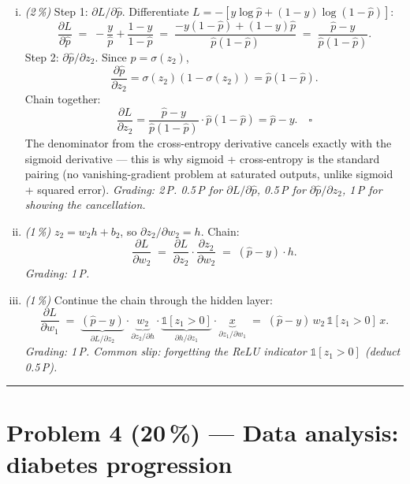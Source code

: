 \documentclass[11pt,a4paper]{article}
\newcommand{\points}[1]{\textbf{(#1\,\%)}}
\newcommand{\subpoints}[1]{\textit{(#1\,\%)}}
\begin{document}
\begin{enumerate}[(i)]
  \item \subpoints{2} Step 1: $\partial L / \partial \hat p$. Differentiate
        $L = -[y\log\hat p + (1-y)\log(1-\hat p)]$:
        $$\frac{\partial L}{\partial \hat p}
          \;=\; -\frac{y}{\hat p} + \frac{1-y}{1-\hat p}
          \;=\; \frac{-y(1-\hat p) + (1-y)\hat p}{\hat p(1-\hat p)}
          \;=\; \frac{\hat p - y}{\hat p(1 - \hat p)}.$$
        Step 2: $\partial \hat p / \partial z_2$. Since $\hat p = \sigma(z_2)$,
        $$\frac{\partial \hat p}{\partial z_2} = \sigma(z_2)(1 - \sigma(z_2)) = \hat p(1 - \hat p).$$
        Chain together:
        $$\frac{\partial L}{\partial z_2}
          = \frac{\hat p - y}{\hat p(1-\hat p)} \cdot \hat p(1-\hat p)
          = \boxed{\hat p - y}. \quad\square$$
        The denominator from the cross-entropy derivative cancels exactly with the sigmoid
        derivative --- this is why sigmoid + cross-entropy is the standard pairing (no
        vanishing-gradient problem at saturated outputs, unlike sigmoid + squared error).
        \emph{Grading: 2\,P. 0.5\,P for $\partial L/\partial \hat p$, 0.5\,P for
        $\partial \hat p / \partial z_2$, 1\,P for showing the cancellation.}

  \item \subpoints{1} $z_2 = w_2 h + b_2$, so $\partial z_2 / \partial w_2 = h$. Chain:
        $$\frac{\partial L}{\partial w_2} \;=\; \frac{\partial L}{\partial z_2}\cdot \frac{\partial z_2}{\partial w_2}
          \;=\; \boxed{(\hat p - y)\cdot h}.$$
        \emph{Grading: 1\,P.}

  \item \subpoints{1} Continue the chain through the hidden layer:
        $$\frac{\partial L}{\partial w_1}
          \;=\; \underbrace{(\hat p - y)}_{\partial L/\partial z_2}\cdot
                \underbrace{w_2}_{\partial z_2/\partial h}\cdot
                \underbrace{\mathbb{1}[z_1 > 0]}_{\partial h/\partial z_1}\cdot
                \underbrace{x}_{\partial z_1/\partial w_1}
          \;=\; \boxed{(\hat p - y)\, w_2\, \mathbb{1}[z_1 > 0]\, x}.$$
        \emph{Grading: 1\,P. Common slip: forgetting the ReLU indicator $\mathbb{1}[z_1 > 0]$
        (deduct 0.5\,P).}
\end{enumerate}

\vspace{0.6em}
\hrule
\vspace{1em}

\section*{Problem 4 \points{20} --- Data analysis: diabetes progression}
\end{document}
